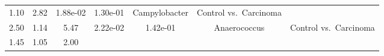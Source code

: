 \documentclass[12pt,]{article}
\begin{document}
\begin{longtable}[]{@{}ccccccc@{}}
\begin{minipage}[t]{0.10\columnwidth}
1.10\strut
\end{minipage} & \begin{minipage}[t]{0.10\columnwidth}\centering\strut
2.82\strut
\end{minipage} & \begin{minipage}[t]{0.08\columnwidth}\centering\strut
1.88e-02\strut
\end{minipage} & \begin{minipage}[t]{0.08\columnwidth}\centering\strut
1.30e-01\strut
\end{minipage} & \begin{minipage}[t]{0.23\columnwidth}\centering\strut
Campylobacter\strut
\end{minipage} & \begin{minipage}[t]{0.16\columnwidth}\centering\strut
Control vs.~Carcinoma\strut
\end{minipage}\tabularnewline
\begin{minipage}[t]{0.06\columnwidth}\centering\strut
2.50\strut
\end{minipage} & \begin{minipage}[t]{0.10\columnwidth}\centering\strut
1.14\strut
\end{minipage} & \begin{minipage}[t]{0.10\columnwidth}\centering\strut
5.47\strut
\end{minipage} & \begin{minipage}[t]{0.08\columnwidth}\centering\strut
2.22e-02\strut
\end{minipage} & \begin{minipage}[t]{0.08\columnwidth}\centering\strut
1.42e-01\strut
\end{minipage} & \begin{minipage}[t]{0.23\columnwidth}\centering\strut
Anaerococcus\strut
\end{minipage} & \begin{minipage}[t]{0.16\columnwidth}\centering\strut
Control vs.~Carcinoma\strut
\end{minipage}\tabularnewline
\begin{minipage}[t]{0.06\columnwidth}\centering\strut
1.45\strut
\end{minipage} & \begin{minipage}[t]{0.10\columnwidth}\centering\strut
1.05\strut
\end{minipage} & \begin{minipage}[t]{0.10\columnwidth}\centering\strut
2.00\strut
\end{minipage} & \begin{minipage}[t]{0.08\columnwidth}\centering\strut

\end{minipage}
\end{longtable}
\end{document}
